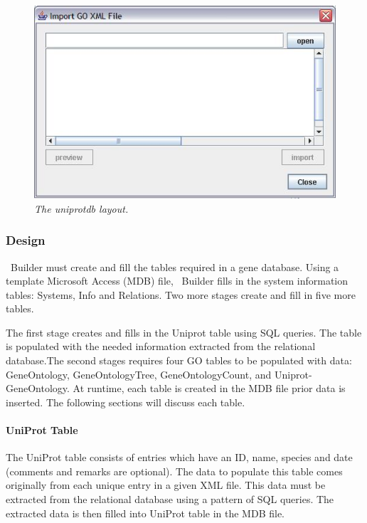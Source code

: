 \begin{figure}[htp]
\centering
\includegraphics[scale=1.0]{Images/goImport.jpg}
\caption{\small \sl The uniprotdb layout.}
\label{fig:uniprotLayout}
\end{figure}

\subsubsection{Design}
\genmapp~Builder must create and fill the tables required in a \genmapp gene database.  Using a template Microsoft Access (MDB) file, \genmapp~Builder fills in the system information tables: Systems, Info and Relations.  Two more stages create and fill in five more tables.

The first stage creates and fills in the Uniprot table using SQL queries.  The table is populated with the needed information extracted from the relational database.The second stages requires four GO tables to be populated with data: GeneOntology, GeneOntologyTree, GeneOntologyCount, and Uniprot-GeneOntology. At runtime, each table is created in the MDB file prior data is inserted. The following sections will discuss each table.


\paragraph{UniProt Table}
\label{uniprottable}
The UniProt table consists of entries which have an ID, name, species and date (comments and remarks are optional).  The data to populate this table comes originally from each unique entry in a given XML file.  This data must be extracted from the relational database using a pattern of SQL queries.  The extracted data is then filled into UniProt table in the MDB file.

